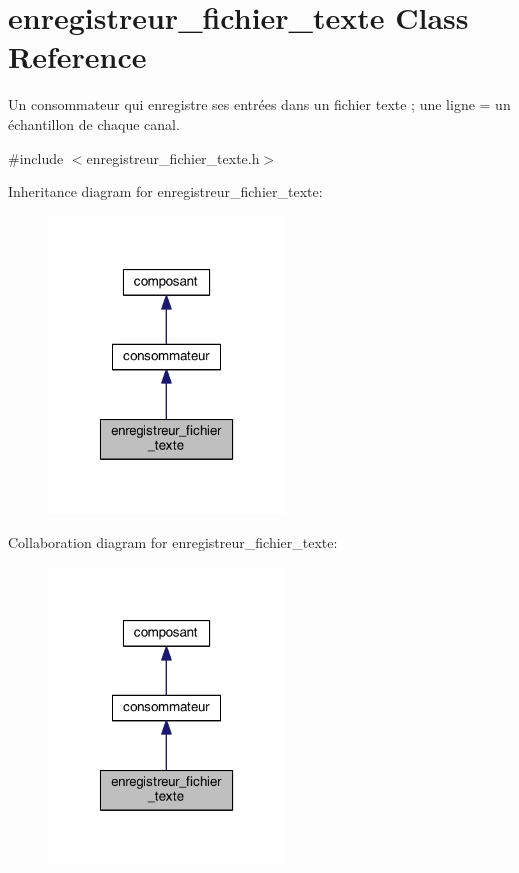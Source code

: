 \hypertarget{classenregistreur__fichier__texte}{\section{enregistreur\-\_\-fichier\-\_\-texte Class Reference}
\label{classenregistreur__fichier__texte}
}


Un consommateur qui enregistre ses entrées dans un fichier texte ; une ligne = un échantillon de chaque canal.  




{\ttfamily \#include $<$enregistreur\-\_\-fichier\-\_\-texte.\-h$>$}



Inheritance diagram for enregistreur\-\_\-fichier\-\_\-texte\-:
\nopagebreak
\begin{figure}[H]
\begin{center}
\leavevmode
\includegraphics[width=178pt]{classenregistreur__fichier__texte__inherit__graph}
\end{center}
\end{figure}


Collaboration diagram for enregistreur\-\_\-fichier\-\_\-texte\-:
\nopagebreak
\begin{figure}[H]
\begin{center}
\leavevmode
\includegraphics[width=178pt]{classenregistreur__fichier__texte__coll__graph}
\end{center}
\end{figure}
